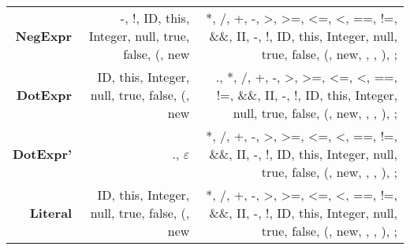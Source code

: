 \documentclass{report}
\begin{document}
\begin{tabularx}{\textwidth}{ r | R | R }
\textbf{NegExpr} &  -, !, ID, this, Integer, null, true, false, (, new &  *, /, +, -, >, >=, <=, <, ==, !=, \&\&, II, -, !, ID, this, Integer, null, true, false, (, new, , , ), ; \\[1ex]
\textbf{DotExpr} & ID, this, Integer, null, true, false, (, new &  ., *, /, +, -, >, >=, <=, <, ==, !=, \&\&, II, -, !, ID, this, Integer, null, true, false, (, new, , , ), ; \\[1ex]
\textbf{DotExpr'} & ., $\varepsilon$ & *, /, +, -, >, >=, <=, <, ==, !=, \&\&, II, -, !, ID, this, Integer, null, true, false, (, new, , , ), ; \\[1ex]
\textbf{Literal} & ID, this, Integer, null, true, false, (, new & *, /, +, -, >, >=, <=, <, ==, !=, \&\&, II, -, !, ID, this, Integer, null, true, false, (, new, , , ), ; \\[1ex]

\hline


\end{tabularx}
\end{document}
